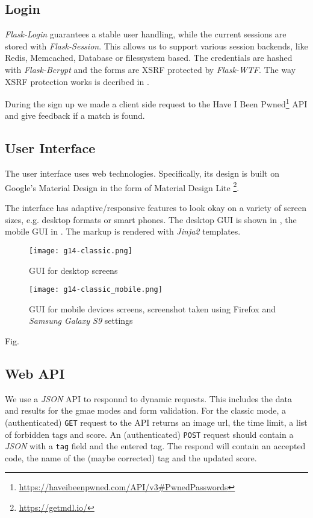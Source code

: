 \subsection{Login}
\label{g14:sec:implementation:login}
\textit{Flask-Login} guarantees a stable user handling, while the current sessions are stored with \textit{Flask-Session}. This allows us to support various session backends, like Redis, Memcached, Database or filessystem based. The credentials are hashed with \textit{Flask-Bcrypt} and the forms are XSRF protected by \textit{Flask-WTF}. The way XSRF protection works is decribed in \cite{4198791}. 

During the sign up we made a client side request to the Have I Been Pwned\footnote{\url{https://haveibeenpwned.com/API/v3\#PwnedPasswords}} API and give feedback if a match is found.

\subsection{User Interface}
\label{g14:sec:implementation:UI}

The user interface uses web technologies. Specifically, its design is built on Google's Material Design in the form of Material Design Lite \footnote{\url{https://getmdl.io/}}.

The interface has adaptive/responsive features to look okay on a variety of screen sizes, e.g. desktop formats or smart phones. The desktop GUI is shown in , the mobile GUI in .
The markup is rendered with \textit{Jinja2} templates.




\begin{figure}[!]
\centering
\texttt{[image: g14-classic.png]}
\caption{GUI for desktop screens}
\label{g14:fig:guiclassicdesktop}
\end{figure}


\begin{figure}[!]
\centering
\texttt{[image: g14-classic\_mobile.png]}
\caption{GUI for mobile devices screens, screenshot taken using Firefox and \textit{Samsung Galaxy S9} settings}
\label{g14:fig:guiclassicmobile}
\end{figure}

Fig. 


\subsection{Web API}
\label{g14:sec:implementation:API}
We use a \textit{JSON} API to responnd to dynamic requests. This includes the data and results for the gmae modes and form validation.
For the classic mode, a (authenticated) \texttt{GET} request to the API returns an image url, the time limit, a list of forbidden tags and score.
An (authenticated) \texttt{POST} request should contain a \textit{JSON} with a \texttt{tag} field and the entered tag. The respond will contain an accepted code, the name of the (maybe corrected) tag and the updated score.

